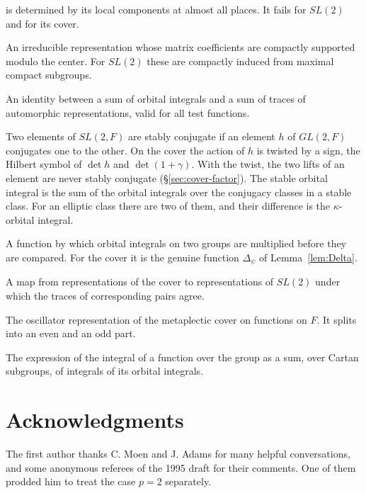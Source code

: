 \documentclass[12pt,letterpaper,openany]{book}
\theoremstyle{plain}
\theoremstyle{definition}
\theoremstyle{remark}
\theoremstyle{remark}
\begin{document}
\begin{description}
is determined by its local components at almost all places. It fails for
$SL(2)$ and for its cover.
\item[Supercuspidal representation.] An irreducible representation whose
matrix coefficients are compactly supported modulo the center. For $SL(2)$
these are compactly induced from maximal compact subgroups.
\item[Trace formula.] An identity between a sum of orbital integrals and a
sum of traces of automorphic representations, valid for all test
functions.
\item[Stable conjugacy.] Two elements of $SL(2,F)$ are stably
conjugate if an element $h$ of $GL(2,F)$ conjugates one to the other. On
the cover the action of $h$ is twisted by a sign, the Hilbert symbol of
$\det h$ and $\det(1+\gamma)$. With the twist, the two lifts
of an element are never stably conjugate (\S\ref{sec:cover-factor}). The
stable orbital integral is the sum of the orbital integrals over the
conjugacy classes in a stable class. For an elliptic class there are
two of them, and their difference is the $\kappa$-orbital integral.
\item[Transfer factor.] A function by which orbital integrals on two
groups are multiplied before they are compared. For the cover it is the
genuine function $\Delta_\psi$ of Lemma~\ref{lem:Delta}.
\item[Transfer.] A map from representations of the cover to
representations of $SL(2)$ under which the traces of corresponding pairs
agree.
\item[Weil representation.] The oscillator representation of the
metaplectic cover on functions on $F$. It splits into an even and an odd
part.
\item[Weyl integration formula.] The expression of the integral of a
function over the group as a sum, over Cartan subgroups, of integrals of
its orbital integrals.
\end{description}

\chapter*{Acknowledgments}

The first author thanks C. Moen and J. Adams for many helpful conversations,
and some anonymous referees of the 1995 draft for their comments.
One of them prodded him to treat the case $p=2$ separately.
\end{document}
